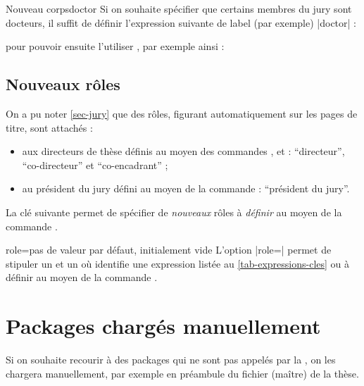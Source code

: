 \begin{dbexample}{Nouveau corps}{doctor}
  Si on souhaite spécifier que certains membres du jury sont docteurs, il
  suffit de définir  l'expression suivante de label (par
  exemple) |doctor| :
\begin{preamblecode}[title=Par exemple dans le \File{\configurationfile}]
\end{preamblecode}
  pour pouvoir ensuite l'utiliser , par
  exemple ainsi :
\begin{bodycode}
\end{bodycode}
\end{dbexample}

\subsection{Nouveaux rôles}\label{sec-nouveaux-roles}

On a pu noter \vref{sec-jury} que des rôles, figurant automatiquement sur les
pages de titre, sont attachés :
\begin{itemize}
\item aux directeurs de thèse définis au moyen des commandes
  ,  et  :
  \enquote{directeur}, \enquote{co-directeur} et \enquote{co-encadrant} ;
\item au président du jury défini au moyen de la commande
   : \enquote{président du jury}.
\end{itemize}
La clé  suivante permet de spécifier de \emph{nouveaux} rôles
à \emph{définir} au moyen de la commande .


\begin{docKey}{role}{=}{pas de valeur par défaut, initialement
    vide}
  L'option |role=| permet de stipuler un  et
  un  où  identifie une expression listée au
  \vref{tab-expressions-cles} ou à définir au moyen de la commande
  .
\end{docKey}


\section{Packages chargés manuellement}
\label{sec-options-de-classes}
Si on souhaite recourir à des packages qui ne sont pas appelés par la \yatCl{},
on les chargera manuellement, par exemple en préambule du fichier (maître) de
la thèse.

